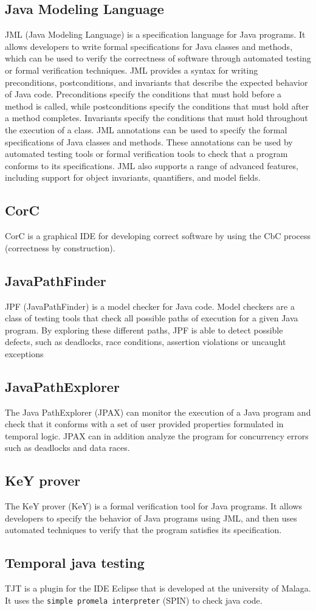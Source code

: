\subsection{Java Modeling Language}
JML (Java Modeling Language) is a specification language for Java programs. It allows developers to write formal specifications for Java classes and methods, which can be used to verify the correctness of software through automated testing or formal verification techniques.
JML provides a syntax for writing preconditions, postconditions, and invariants that describe the expected behavior of Java code. Preconditions specify the conditions that must hold before a method is called, while postconditions specify the conditions that must hold after a method completes. Invariants specify the conditions that must hold throughout the execution of a class.
JML annotations can be used to specify the formal specifications of Java classes and methods. These annotations can be used by automated testing tools or formal verification tools to check that a program conforms to its specifications. JML also supports a range of advanced features, including support for object invariants, quantifiers, and model fields.
\subsection{CorC}
CorC is a graphical IDE for developing correct software by using the CbC process (correctness by construction). 
\subsection{JavaPathFinder}
JPF (JavaPathFinder) is a model checker for Java code. Model checkers are a class of testing tools that check all possible paths of execution for a given Java program. 
By exploring these different paths, JPF is able to detect possible defects, such as deadlocks, race conditions, assertion violations or uncaught exceptions
\subsection{JavaPathExplorer}
 The Java PathExplorer (JPAX) can monitor the execution of a Java program and check that it conforms with a set of user provided properties
 formulated in temporal logic. JPAX can in addition analyze the program for concurrency errors such as deadlocks
 and data races.\citep{HR4}
\subsection{KeY prover}
The KeY prover (KeY) is a formal verification tool for Java programs. It allows developers to specify the behavior of Java programs using JML, and then uses automated techniques to verify that the program satisfies its specification.
\subsection[TJT]{Temporal java testing}
TJT is a plugin for the IDE Eclipse that is developed at the university of Malaga. It uses the \verb|simple promela interpreter| (SPIN) to check java code.